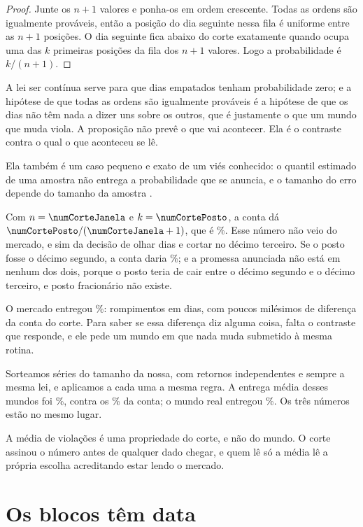 \begin{proof}
Junte os $n+1$ valores e ponha-os em ordem crescente. Todas as ordens são igualmente
prováveis, então a posição do dia seguinte nessa fila é uniforme entre as $n+1$ posições. O
dia seguinte fica abaixo do corte exatamente quando ocupa uma das $k$ primeiras posições da
fila dos $n+1$ valores. Logo a probabilidade é $k/(n+1)$.
\end{proof}

A lei ser contínua serve para que dias empatados tenham probabilidade zero; e a hipótese de
que todas as ordens são igualmente prováveis é a hipótese de que os dias não têm nada a dizer
uns sobre os outros, que é justamente o que um mundo que muda viola. A proposição não prevê o
que vai acontecer. Ela é o contraste contra o qual o que aconteceu se lê.

Ela também é um caso pequeno e exato de um viés conhecido: o quantil estimado de uma amostra
não entrega a probabilidade que se anuncia, e o tamanho do erro depende do tamanho da amostra
\cite{taleb2020super}.

Com $n = \numCorteJanela$ e $k = \numCortePosto$, a conta dá
$\numCortePosto/(\numCorteJanela+1)$, que é \numCorteContaPct\%. Esse número não veio do
mercado, e sim da decisão de olhar \numCorteJanela{} dias e cortar no décimo terceiro. Se o
posto fosse o décimo segundo, a conta daria \numCorteAlternativoPct\%; e a promessa anunciada
não está em nenhum dos dois, porque o posto teria de cair entre o décimo segundo e o décimo
terceiro, e posto fracionário não existe.

O mercado entregou \numEntregaTaxaPct\%: \numEntregaViolacoes{} rompimentos em
\numEntregaDias{} dias, com poucos milésimos de diferença da conta do corte. Para saber se
essa diferença diz alguma coisa, falta o contraste que responde, e ele pede um mundo em que
nada muda submetido à mesma rotina.

Sorteamos \numNuncaMudaMundos{} séries do tamanho da nossa, com retornos independentes e
sempre a mesma lei, e aplicamos a cada uma a mesma regra. A entrega média desses mundos foi
\numNuncaMudaTaxaPct\%, contra os \numCorteContaPct\% da conta; o mundo real entregou
\numEntregaTaxaPct\%. Os três números estão no mesmo lugar.

A média de violações é uma propriedade do corte, e não do mundo. O corte assinou o número
antes de qualquer dado chegar, e quem lê só a média lê a própria escolha acreditando estar
lendo o mercado.

\section{Os blocos têm data}


